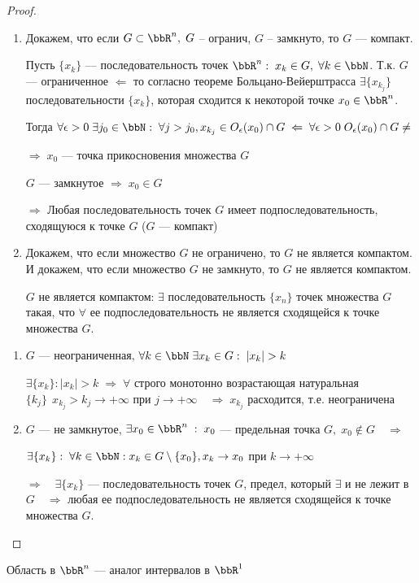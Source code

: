 \begin{proof}
\begin{enumerate}
\item
Докажем, что если $G \subset \bbR^n, \; G$ -- огранич, $G$ -- замкнуто, то $G$ --- компакт.

Пусть $\{ x_k \}$ --- последовательность точек $\bbR^n: \; x_k \in G, \; \forall k \in \bbN$. Т.к. $G$ --- ограниченное $\Leftarrow$ то согласно теореме Больцано-Вейерштрасса $\exists \{ x_{k_j} \}$ последовательности $\{ x_k \}$, которая сходится к некоторой точке $x_0 \in \bbR^n$.

Тогда $\forall \epsilon > 0 \; \exists j_0 \in \bbN: \; \forall j > j_0, x_{k_j} \in O_\epsilon(x_0) \cap G \; \Leftarrow \; \forall \epsilon > 0 \; O_\epsilon(x_0) \cap G \not= $

$\Rightarrow \; x_0$ --- точка прикосновения множества $G$

$G$ --- замкнутое $\Rightarrow \; x_0 \in G$

$\Rightarrow$ Любая последовательность точек $G$ имеет подпоследовательность, сходящуюся к точке $G$ ($G$ --- компакт)

\item

Докажем, что если множество $G$ не ограничено, то $G$ не является компактом. И докажем, что если множество $G$ не замкнуто, то $G$ не является компактом.

$G$ не является компактом: $\exists$ последовательность $\{ x_n \}$ точек множества $G$ такая, что $\forall$ ее подпоследовательность не является сходящейся к точке множества $G$. 
\end{enumerate}

\begin{enumerate}
\item

$G$ --- неограниченная, $\forall k \in \bbN \; \exists x_k \in G: \; |x_k| > k$

$\exists \{ x_k \}: |x_k| > k \; \Rightarrow \; \forall$ строго монотонно возрастающая натуральная $\{ k_j \}\ \  x_{k_j} > k_j \to +\infty$ при $j \to +\infty \quad \Rightarrow \; x_{k_j}$ расходится, т.е. неограничена 

\item

$G$ --- не замкнутое, $\exists x_0 \in \bbR^n \;:\; x_0$ --- предельная точка $G, \; x_0 \notin G \quad \Rightarrow$

$\exists \{ x_k \}: \; \forall k \in \bbN: x_k \in G \setminus \{ x_0 \}, x_k \to x_0$ при $k \to +\infty$

$\Rightarrow \quad \exists \{ x_k \}$ --- последовательность точек $G$, предел, который $\exists$ и не лежит в $G \quad \Rightarrow$  любая ее подпоследовательность не является сходящейся к точке множества $G$.\qedhere
\end{enumerate}
\end{proof}
Область в $\bbR^n$ --- аналог интервалов в $\bbR^1$

